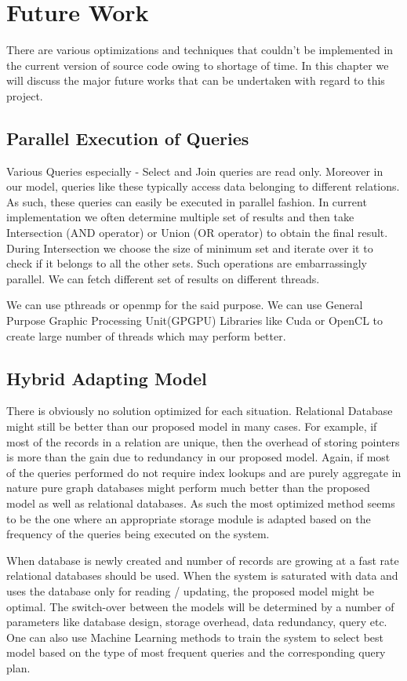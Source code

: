\documentclass[12pt, oneside]{book}
\begin{document}
\section{Future Work}
There are various optimizations and techniques that couldn't be implemented in the current version of source code owing to shortage of time. In this chapter we will discuss the major future works that can be undertaken with regard to this project.
\subsection{Parallel Execution of Queries}
Various Queries especially - Select and Join queries are read only. Moreover in our model, queries like these typically access data belonging to different relations. As such, these queries can easily be executed in parallel fashion. In current implementation we often determine multiple set of results and then take Intersection (AND operator) or Union (OR operator) to obtain the final result. During Intersection we choose the size of minimum set and iterate over it to check if it belongs to all the other sets. Such operations are embarrassingly parallel. We can fetch different set of results on different threads. \par
We can use pthreads or openmp for the said purpose. We can use General Purpose Graphic Processing Unit(GPGPU) Libraries like Cuda or OpenCL to create large number of threads which may perform better.
\subsection{Hybrid Adapting Model}
There is obviously no solution optimized for each situation. Relational Database might still be better than our proposed model in many cases. For example, if most of the records in a relation are unique, then the overhead of storing pointers is more than the gain due to redundancy in our proposed model. Again, if most of the queries performed do not require index lookups and are purely aggregate in nature pure graph databases might perform much better than the proposed model as well as relational databases. As such the most optimized method seems to be the one where an appropriate storage module is adapted based on the frequency of the queries being executed on the system. \par
When database is newly created and number of records are growing at a fast rate relational databases should be used. When the system is saturated with data and uses the database only for reading / updating, the proposed model might be optimal. The switch-over between the models will be determined by a number of parameters like database design, storage overhead, data redundancy, query etc. One can also use Machine Learning methods to train the system to select best model based on the type of most frequent queries and the corresponding query plan.
\end{document}
